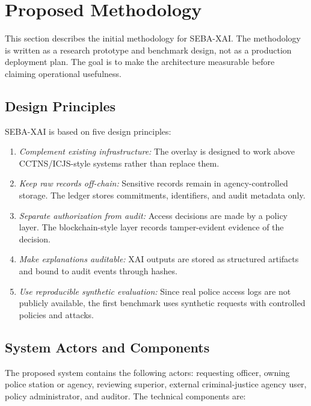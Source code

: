 \section{Proposed Methodology}

This section describes the initial methodology for SEBA-XAI. The methodology is written as a research prototype and benchmark design, not as a production deployment plan. The goal is to make the architecture measurable before claiming operational usefulness.

\subsection{Design Principles}

SEBA-XAI is based on five design principles:
\begin{enumerate}
    \item \textit{Complement existing infrastructure:} The overlay is designed to work above CCTNS/ICJS-style systems rather than replace them.
    \item \textit{Keep raw records off-chain:} Sensitive records remain in agency-controlled storage. The ledger stores commitments, identifiers, and audit metadata only.
    \item \textit{Separate authorization from audit:} Access decisions are made by a policy layer. The blockchain-style layer records tamper-evident evidence of the decision.
    \item \textit{Make explanations auditable:} XAI outputs are stored as structured artifacts and bound to audit events through hashes.
    \item \textit{Use reproducible synthetic evaluation:} Since real police access logs are not publicly available, the first benchmark uses synthetic requests with controlled policies and attacks.
\end{enumerate}

\subsection{System Actors and Components}

The proposed system contains the following actors: requesting officer, owning police station or agency, reviewing superior, external criminal-justice agency user, policy administrator, and auditor. The technical components are:


